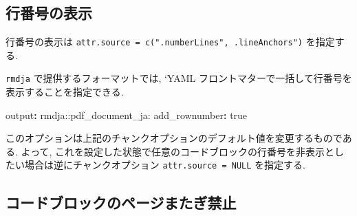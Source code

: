 \documentclass[
  xelatex,ja=standard,jafont=noto]{bxjsbook}
\newenvironment{Shaded}{\begin{snugshade}}{\end{snugshade}}
\newcommand{\AttributeTok}[1]{\textcolor[rgb]{0.77,0.63,0.00}{#1}}
\newcommand{\CharTok}[1]{\textcolor[rgb]{0.31,0.60,0.02}{#1}}
\newcommand{\FunctionTok}[1]{\textcolor[rgb]{0.00,0.00,0.00}{#1}}
\newcommand{\KeywordTok}[1]{\textcolor[rgb]{0.13,0.29,0.53}{\textbf{#1}}}
\providecommand{\tightlist}{%
  \setlength{\itemsep}{0pt}\setlength{\parskip}{0pt}}
\theoremstyle{definition}
\theoremstyle{definition}
\theoremstyle{definition}
\theoremstyle{definition}
\theoremstyle{remark}
\begin{document}

\hypertarget{ux884cux756aux53f7ux306eux8868ux793a}{%
\subsection{行番号の表示}\label{ux884cux756aux53f7ux306eux8868ux793a}}

行番号の表示は
\texttt{attr.source\ =\ c(".numberLines",\ .lineAnchors")} を指定する.

\texttt{rmdja} で提供するフォーマットでは, `YAML
フロントマターで一括して行番号を表示することを指定できる.

\begin{Shaded}
\begin{Highlighting}[]
\FunctionTok{output}\KeywordTok{:}\AttributeTok{ rmdja::pdf\_document\_ja:}
\AttributeTok{  }\FunctionTok{add\_rownumber}\KeywordTok{:}\AttributeTok{ }\CharTok{true}
\end{Highlighting}
\end{Shaded}

このオプションは上記のチャンクオプションのデフォルト値を変更するものである.
よって,
これを設定した状態で任意のコードブロックの行番号を非表示としたい場合は逆にチャンクオプション
\texttt{attr.source\ =\ NULL} を指定する.

\hypertarget{ux30b3ux30fcux30c9ux30d6ux30edux30c3ux30afux306eux30daux30fcux30b8ux307eux305fux304eux7981ux6b62}{%
\subsection{コードブロックのページまたぎ禁止}\label{ux30b3ux30fcux30c9ux30d6ux30edux30c3ux30afux306eux30daux30fcux30b8ux307eux305fux304eux7981ux6b62}}
\end{document}
